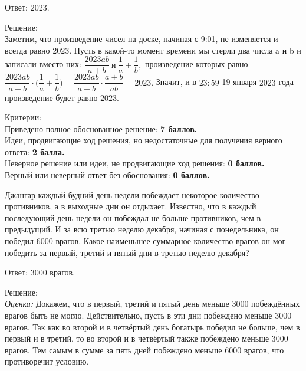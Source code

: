 \hspace{3mm}

Ответ: $2023$.

\newpage

\hspace{3mm}

Решение:\\
Заметим, что произведение чисел на доске, начиная с 9:01, не изменяется и всегда равно $2023$. 
Пусть в какой-то момент времени мы стерли два числа a и b и записали вместо них: $\dfrac{2023ab}{a+b} \ \text{и} \ \dfrac{1}{a} + \dfrac{1}{b},$ произведение которых равно $\dfrac{2023ab}{a+b} \cdot \Biggl( \dfrac{1}{a} + \dfrac{1}{b} \Biggr) = \dfrac{2023ab}{a+b} \cdot \dfrac{a+b}{ab} = 2023.$
Значит, и в $23:59$ 19 января $2023$ года произведение будет равно $2023$.

\hspace{3mm}

Критерии:\\
Приведено полное обоснованное решение: \textbf{7 баллов.}\\
Идеи, продвигающие ход решения, но недостаточные для получения верного ответа: \textbf{2 балла.}\\
Неверное решение или идеи, не продвигающие ход решения: \textbf{0 баллов.}\\
Верный или неверный ответ без обоснования: \textbf{0 баллов.}


\hspace{3mm}

Джангар каждый будний день недели побеждает некоторое количество противников, а в выходные дни он отдыхает. Известно, что в каждый последующий день недели он побеждал не больше противников, чем в предыдущий. И за всю третью неделю декабря, начиная с понедельника, он победил 6000 врагов. Какое наименьшее суммарное количество врагов он мог победить за первый, третий и пятый дни в третью неделю декабря?

\hspace{3mm}


Ответ: 3000 врагов.

Решение:\\
\textit{Оценка:} Докажем, что в первый, третий и пятый день меньше 3000 побеждённых врагов быть не могло. 
Действительно,  пусть в эти дни побеждено меньше 3000 врагов. Так как во второй и в четвёртый день богатырь победил не больше, чем в первый и в третий, то во второй и в четвёртый также побеждено меньше 3000 врагов. Тем самым в сумме за пять дней побеждено меньше 6000 врагов, что противоречит условию. 

